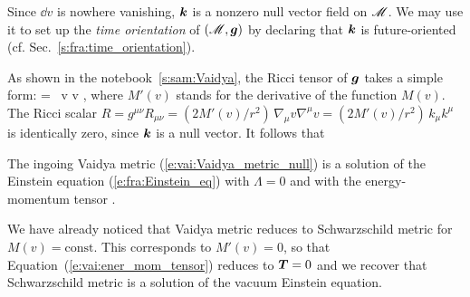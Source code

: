 \begin{greybox}
Since $\dd v$ is nowhere vanishing, $\bm{k}$ is a nonzero null vector field on $\mathscr{M}$.
We may use it to set up the \emph{time orientation} of $(\mathscr{M},\bm{g})$
by declaring that $\bm{k}$ is future-oriented (cf. Sec.~\ref{s:fra:time_orientation}).
\end{greybox}

As shown in the notebook~\ref{s:sam:Vaidya},
the Ricci tensor of $\bm{g}$ takes a simple form:
\be \label{e:vai:Ricci_tensor}
     = \, \dd v \otimes \dd v ,
\ee
where $M'(v)$ stands for the derivative of the function $M(v)$.
The Ricci scalar $R = g^{\mu\nu} R_{\mu\nu} = (2M'(v)/r^2) \, \nabla_\mu v \nabla^\mu v =  (2M'(v)/r^2) \, k_\mu k^\mu$ is identically zero, since $\bm{k}$ is a null vector.
It follows that
\begin{greybox}
The ingoing Vaidya metric (\ref{e:vai:Vaidya_metric_null}) is a solution
of the Einstein equation (\ref{e:fra:Einstein_eq})
with $\Lambda = 0$ and with the energy-momentum tensor
\be \label{e:vai:ener_mom_tensor}
    .
\ee
\end{greybox}

\begin{remark}
We have already noticed that Vaidya metric reduces to Schwarzschild metric for $M(v) = \mathrm{const}$.
This corresponds to $M'(v) = 0$, so that
Equation~(\ref{e:vai:ener_mom_tensor}) reduces to $\bm{T} = 0$ and we recover that
Schwarzschild metric is a solution of the vacuum Einstein equation.
\end{remark}

